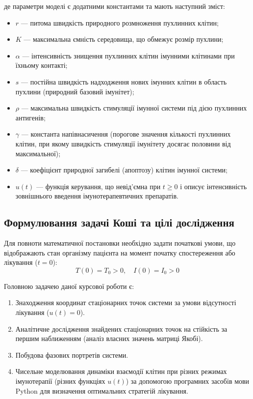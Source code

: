 де параметри моделі є додатними константами та мають наступний зміст:
\begin{itemize}
	\item $r$ — питома швидкість природного розмноження пухлинних клітин;
	\item $K$ — максимальна ємність середовища, що обмежує розмір пухлини;
	\item $\alpha$ — інтенсивність знищення пухлинних клітин імунними клітинами при їхньому контакті;
	\item $s$ — постійна швидкість надходження нових імунних клітин в область пухлини (природний базовий імунітет);
	\item $\rho$ — максимальна швидкість стимуляції імунної системи під дією пухлинних антигенів;
	\item $\gamma$ — константа напівнасичення (порогове значення кількості пухлинних клітин, при якому швидкість стимуляції імунітету досягає половини від максимальної);
	\item $\delta$ — коефіцієнт природної загибелі (апоптозу) клітин імунної системи;
	\item $u(t)$ — функція керування, що невід'ємна при $t \ge 0$ і описує інтенсивність зовнішнього введення імунотерапевтичних препаратів.
\end{itemize}

\subsection{Формулювання задачі Коші та цілі дослідження}
Для повноти математичної постановки необхідно задати початкові умови, що відображають стан організму пацієнта на момент початку спостереження або лікування ($t = 0$):
\begin{equation}
	T(0) = T_0 > 0, \quad I(0) = I_0 > 0
\end{equation}

Головною задачею даної курсової роботи є:
\begin{enumerate}
	\item Знаходження координат стаціонарних точок системи за умови відсутності лікування ($u(t) = 0$).
	\item Аналітичне дослідження знайдених стаціонарних точок на стійкість за першим наближенням (аналіз власних значень матриці Якобі).
	\item Побудова фазових портретів системи.
	\item Чисельне моделювання динаміки взаємодії клітин при різних режимах імунотерапії (різних функціях $u(t)$) за допомогою програмних засобів мови Python для визначення оптимальних стратегій лікування.
\end{enumerate}